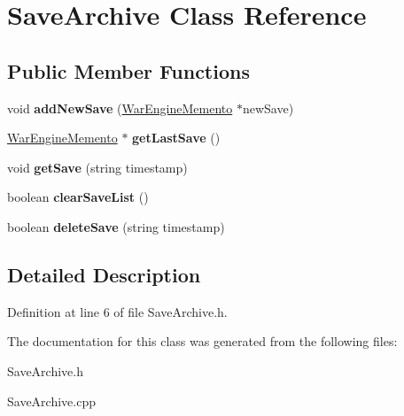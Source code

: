 \hypertarget{classSaveArchive}{}\section{Save\+Archive Class Reference}
\label{classSaveArchive}
\subsection*{Public Member Functions}
\begin{DoxyCompactItemize}
\item 
\mbox{\label{classSaveArchive_a0bcf25bc0602efad6a69e8448bbd25f7}} 
void {\bfseries add\+New\+Save} (\hyperlink{classWarEngineMemento}{War\+Engine\+Memento} $\ast$new\+Save)
\item 
\mbox{\label{classSaveArchive_a144c8a27272d190164ad1f0e9dbdcc01}} 
\hyperlink{classWarEngineMemento}{War\+Engine\+Memento} $\ast$ {\bfseries get\+Last\+Save} ()
\item 
\mbox{\label{classSaveArchive_aaebd805eb43631e9899c7da14236a988}} 
void {\bfseries get\+Save} (string timestamp)
\item 
\mbox{\label{classSaveArchive_a114391b16e0973a6816a139221319555}} 
boolean {\bfseries clear\+Save\+List} ()
\item 
\mbox{\label{classSaveArchive_ac84a00ea43945cdada9188c812e29290}} 
boolean {\bfseries delete\+Save} (string timestamp)
\end{DoxyCompactItemize}


\subsection{Detailed Description}


Definition at line 6 of file Save\+Archive.\+h.



The documentation for this class was generated from the following files\+:\begin{DoxyCompactItemize}
\item 
Save\+Archive.\+h\item 
Save\+Archive.\+cpp\end{DoxyCompactItemize}
